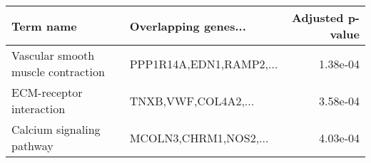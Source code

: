 \begin{tabular}{llr}
\toprule
                         Term name &    Overlapping genes... &  Adjusted p-value \\
\midrule
Vascular smooth muscle contraction & PPP1R14A,EDN1,RAMP2,... &          1.38e-04 \\
          ECM-receptor interaction &     TNXB,VWF,COL4A2,... &          3.58e-04 \\
         Calcium signaling pathway &   MCOLN3,CHRM1,NOS2,... &          4.03e-04 \\
\bottomrule
\end{tabular}

